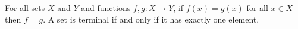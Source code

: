  For all sets $X$ and $Y$ and functions $f, g \colon X \to Y$, if $f(x) = g(x)$ for all $x \in X$ then $f = g$.
 A set is terminal if and only if it has exactly one element.
